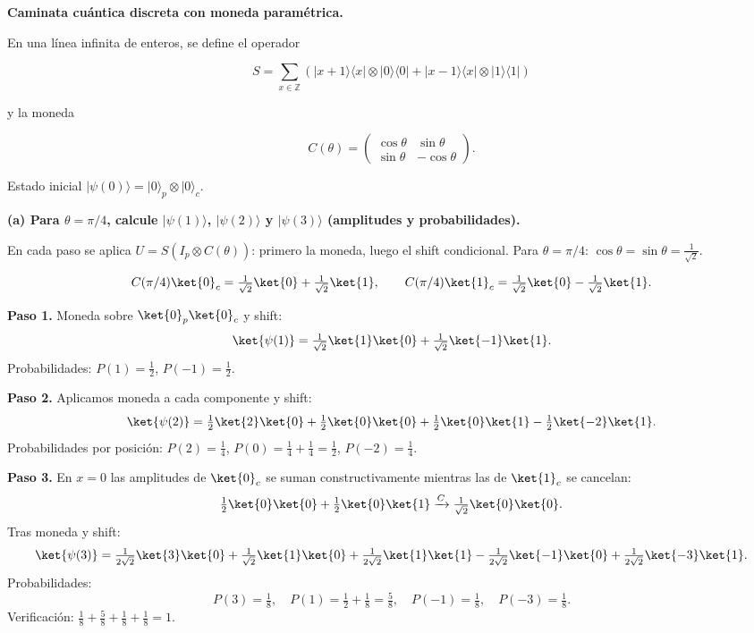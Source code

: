{\bfseries Caminata cuántica discreta con moneda paramétrica.

En una línea infinita de enteros, se define el operador

$$
    S = \sum_{x \in \mathbb{Z}} \left(
    |x+1\rangle \langle x| \otimes |0\rangle \langle 0|
    +
    |x-1\rangle \langle x| \otimes |1\rangle \langle 1|
    \right)
$$

y la moneda

$$
    C(\theta)=
    \begin{pmatrix}
        \cos\theta & \sin\theta  \\
        \sin\theta & -\cos\theta
    \end{pmatrix}.
$$

Estado inicial $|\psi(0)\rangle = |0\rangle_p \otimes |0\rangle_c$.}

{\bfseries (a) Para $\theta = \pi/4$, calcule $|\psi(1)\rangle$, $|\psi(2)\rangle$ y $|\psi(3)\rangle$ (amplitudes y probabilidades).}

En cada paso se aplica $U = S(I_p \otimes C(\theta))$: primero la moneda, luego el shift condicional. Para $\theta = \pi/4$: $\cos\theta = \sin\theta = \tfrac{1}{\sqrt{2}}$.

$$
    C(\pi/4)\ket{0}_c = \tfrac{1}{\sqrt{2}}\ket{0} + \tfrac{1}{\sqrt{2}}\ket{1}, \qquad C(\pi/4)\ket{1}_c = \tfrac{1}{\sqrt{2}}\ket{0} - \tfrac{1}{\sqrt{2}}\ket{1}.
$$

\textbf{Paso 1.} Moneda sobre $\ket{0}_p\ket{0}_c$ y shift:
$$
    \ket{\psi(1)} = \tfrac{1}{\sqrt{2}}\ket{1}\ket{0} + \tfrac{1}{\sqrt{2}}\ket{-1}\ket{1}.
$$
Probabilidades: $P(1) = \tfrac{1}{2}$, $P(-1) = \tfrac{1}{2}$.

\textbf{Paso 2.} Aplicamos moneda a cada componente y shift:
$$
    \ket{\psi(2)} = \tfrac{1}{2}\ket{2}\ket{0} + \tfrac{1}{2}\ket{0}\ket{0} + \tfrac{1}{2}\ket{0}\ket{1} - \tfrac{1}{2}\ket{-2}\ket{1}.
$$
Probabilidades por posición: $P(2) = \tfrac{1}{4}$, $P(0) = \tfrac{1}{4}+\tfrac{1}{4} = \tfrac{1}{2}$, $P(-2) = \tfrac{1}{4}$.

\textbf{Paso 3.} En $x=0$ las amplitudes de $\ket{0}_c$ se suman constructivamente mientras las de $\ket{1}_c$ se cancelan:
$$
    \tfrac{1}{2}\ket{0}\ket{0}+\tfrac{1}{2}\ket{0}\ket{1} \xrightarrow{C} \tfrac{1}{\sqrt{2}}\ket{0}\ket{0}.
$$
Tras moneda y shift:
$$
    \ket{\psi(3)} = \tfrac{1}{2\sqrt{2}}\ket{3}\ket{0} + \tfrac{1}{\sqrt{2}}\ket{1}\ket{0} + \tfrac{1}{2\sqrt{2}}\ket{1}\ket{1} - \tfrac{1}{2\sqrt{2}}\ket{-1}\ket{0} + \tfrac{1}{2\sqrt{2}}\ket{-3}\ket{1}.
$$
Probabilidades:
$$
    P(3)=\tfrac{1}{8}, \quad P(1)=\tfrac{1}{2}+\tfrac{1}{8}=\tfrac{5}{8}, \quad P(-1)=\tfrac{1}{8}, \quad P(-3)=\tfrac{1}{8}.
$$
Verificación: $\tfrac{1}{8}+\tfrac{5}{8}+\tfrac{1}{8}+\tfrac{1}{8}=1$.

